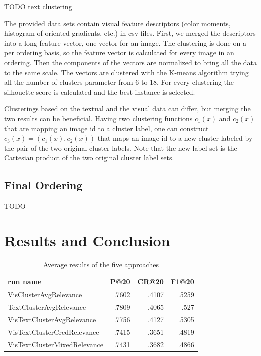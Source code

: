 \documentclass{acm_proc_article-me}
\begin{document}
TODO text clustering

The provided data sets contain visual feature descriptors (color moments, histogram of oriented gradients, etc.) in csv files. First, we merged the descriptors into a long feature vector, one vector for an image. The clustering is done on a per ordering basis, so the feature vector is calculated for every image in an ordering. Then the components of the vectors are normalized to bring all the data to the same scale. The vectors are clustered with the K-means algorithm trying all the number of clusters parameter from 6 to 18. For every clustering the silhouette score \cite{rousseeuw1987silhouettes} is calculated and the best instance is selected.

Clusterings based on the textual and the visual data can differ, but merging the two results can be beneficial. Having two clustering functions $c_1(x)$ and $c_2(x)$ that are mapping an image id to a cluster label, one can construct $c_3(x) = (c_1(x), c_2(x))$ that maps an image id to a new cluster labeled by the pair of the two original cluster labels. Note that the new label set is the Cartesian product of the two original cluster label sets.

\subsection{Final Ordering}

TODO

\section{Results and Conclusion}

\begin{table}[h]
\begin{tabular}{|l|r|r|r|}
	\hline 
	run name & P@20 & CR@20 & F1@20\tabularnewline
	\hline 
	\hline 
	VisClusterAvgRelevance & .7602 & .4107 & .5259\tabularnewline
	\hline 
	TextClusterAvgRelevance & .7809 & .4065 & .527\tabularnewline
	\hline 
	VisTextClusterAvgRelevance & .7756 & .4127 & .5305\tabularnewline
	\hline 
	VisTextClusterCredRelevance & .7415 & .3651 & .4819\tabularnewline
	\hline 
	VisTextClusterMixedRelevance & .7431 & .3682 & .4866\tabularnewline
	\hline 
\end{tabular}
\caption{Average results of the five approaches}
\end{table}
\end{document}
